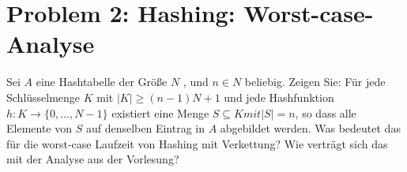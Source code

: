 \section*{{Problem 2: Hashing: Worst-case-Analyse}} 

Sei $A$ eine Hashtabelle der Größe $N$ , und $n \in N$ beliebig. Zeigen Sie: Für jede Schlüsselmenge $K$ mit $|K| \geq (n - 1)N + 1$ und jede Hashfunktion $h : K \rightarrow \{0,\dots, N - 1\}$ existiert eine Menge $S \subseteq K mit |S| = n$, so dass alle Elemente von $S$ auf denselben Eintrag in $A$ abgebildet werden. Was bedeutet das für die worst-case Laufzeit von Hashing mit Verkettung? Wie verträgt sich das mit der Analyse aus der Vorlesung?